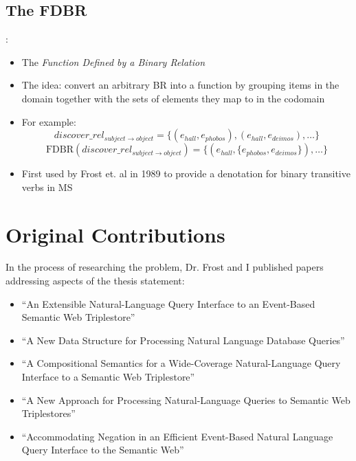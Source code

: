 \documentclass[logoontitle,tabu,supertabular,aspectratio=43]{preney-uwindsor-beamer}
\newcommand{\entityassoc}[1]{e_{#1}}
\newcommand{\FDBR}[1]{\mathrm{FDBR}({#1})}
\newcommand{\relationn}[3]{\mathit{#1\_rel_{#2 \rightarrow #3}}}
\begin{document}
    \subsection{The FDBR}
    \begin{frame}{\insertsection: \insertsubsection}
        \begin{itemize}
            \item The {\em Function Defined by a Binary Relation}
            \item The idea: convert an arbitrary BR into a function by grouping items in the domain together with the sets of elements they map to in the codomain
            \item For example:
            \begin{equation*}
                \relationn{discover}{subject}{object} = \{(\entityassoc{hall}, \entityassoc{phobos}),(\entityassoc{hall},\entityassoc{deimos}),\ldots\}
            \end{equation*}
            \begin{equation*}
                \FDBR{\relationn{discover}{subject}{object}} = \big\{(\entityassoc{hall}, \{\entityassoc{phobos}, \entityassoc{deimos}\}), \ldots\big\}
            \end{equation*}
            \item First used by Frost et. al in 1989 \cite{frost1989constructing} to provide a denotation for binary transitive verbs in MS
        \end{itemize}
    \end{frame}

    \section{Original Contributions}

    \begin{frame}{\insertsection}
        In the process of researching the problem, Dr. Frost and I published papers addressing aspects of the thesis statement:
        \begin{itemize}
            \item ``An Extensible Natural-Language Query Interface to an Event-Based Semantic Web Triplestore'' \cite{frost2018extensible}
            \item ``A New Data Structure for Processing Natural Language Database Queries'' \cite{frostpeelar2019}
            \item ``A Compositional Semantics for a Wide-Coverage Natural-Language Query Interface to a Semantic Web Triplestore'' \cite{peelar2020compositional}
            \item ``A New Approach for Processing Natural-Language Queries to Semantic Web Triplestores'' \cite{peelar2020webistjournal}
            \item ``Accommodating Negation in an Efficient Event-Based Natural Language Query Interface to the Semantic Web'' \cite{peelarfrostwebist2020}
        \end{itemize}

    \end{frame}
\end{document}
